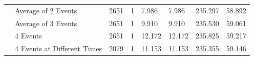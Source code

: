 \begin{table}[ht]
\begin{tabular}{@{}clllllll@{}}
                                                                                                                       & Average of 2 Events               & 2651                                                                         & 1                                                                              & 7.986                                                                          & 7.986                                                                            & 235.297                                                                                 & 58.892                                                                                   \\
                                                                                                                       & Average of 3 Events               & 2651                                                                         & 1                                                                              & 9.910                                                                          & 9.910                                                                            & 235.530                                                                                 & 59.061                                                                                   \\
                                                                                                                       & 4 Events                          & 2651                                                                         & 1                                                                              & 12.172                                                                         & 12.172                                                                           & 235.825                                                                                 & 59.217                                                                                   \\
                                                                                                                       & 4 Events at Different Times       & 2079                                                                         & 1                                                                              & 11.153                                                                         & 11.153                                                                           & 235.355                                                                                 & 59.146                                                                                   \\ \midrule

\end{tabular}
\end{table}
